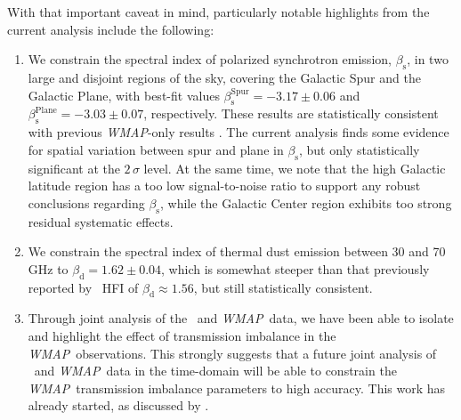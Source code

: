 \documentclass[twocolumn]{aa}
\def\WMAP{\textit{WMAP}}
\newcommand{\?}[1]{\textcolor{red}{{\bf [#1]}}}
\begin{document}
With that important caveat in mind, particularly notable highlights
from the current analysis include the following:
\begin{enumerate}
\item We constrain the spectral index of polarized synchrotron emission,
  $\beta_{\mathrm{s}}$, in two large and disjoint regions of the sky, covering
  the Galactic Spur and the Galactic Plane, with best-fit values $\beta_{\mathrm
  s}^{\mathrm{Spur}}=-3.17\pm 0.06$ and $\beta_{\mathrm
  s}^{\mathrm{Plane}}=-3.03\pm 0.07$, respectively. These results are
  statistically consistent with previous \WMAP-only results \citep{dunkley2009}.
  The current analysis finds some evidence for spatial variation between spur
  and plane in $\beta_{\mathrm{s}}$, but only statistically significant at the
  $2\,\sigma$ level. At the same time, we note that the high Galactic latitude
  region has a too low signal-to-noise ratio to support any robust conclusions
  regarding $\beta_{\mathrm{s}}$, while the Galactic Center region exhibits too
  strong residual systematic effects.
\item We constrain the spectral index of thermal dust emission between
  30 and 70\,GHz to $\beta_{\mathrm d}=1.62\pm 0.04$, which is somewhat steeper
  than that previously reported by \Planck\ HFI \citep{planck2016-l04,
    planck2020-LVII} of $\beta_{\mathrm{d}}\approx 1.56$, but still
  statistically consistent. 
\item Through joint analysis of the \Planck\ and \WMAP\ data, we have
  been able to isolate and highlight the effect of transmission
  imbalance in the \WMAP\ observations. This strongly suggests that a
  future joint analysis of \Planck\ and \WMAP\ data in the time-domain
  will be able to constrain the \WMAP\ transmission imbalance
  parameters to high accuracy. This work has already started, as
  discussed by \citet{bp17}.
\end{enumerate}
\end{document}
